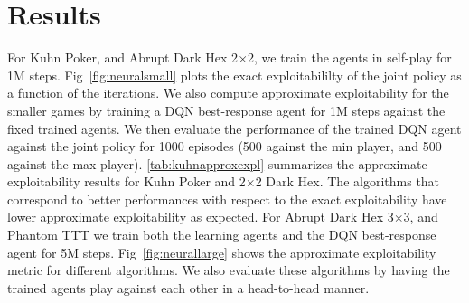 \section{Results}
For Kuhn Poker, and Abrupt Dark Hex 2$\times$2, we train the agents in self-play for 1M steps.
Fig~\ref{fig:neuralsmall} plots the exact exploitabililty of the joint policy as a function of the
iterations.
We also compute approximate exploitability for the smaller games by training a DQN best-response
agent for 1M steps against the fixed trained agents.
We then evaluate the performance of the trained DQN agent against the joint policy for 1000
episodes (500 against the min player, and 500 against the max player).
\ref{tab:kuhnapproxexpl} summarizes the approximate exploitability results for Kuhn Poker and 2$\times$2 Dark Hex.
The algorithms that correspond to better performances with respect to the exact exploitability have
lower approximate exploitability as expected.
For Abrupt Dark Hex 3$\times$3, and Phantom TTT we train both the learning agents and the DQN
best-response agent for 5M steps.
Fig~\ref{fig:neurallarge} shows the approximate exploitability metric for different algorithms.
We also evaluate these algorithms by having the trained agents play against each other in a
head-to-head manner.
